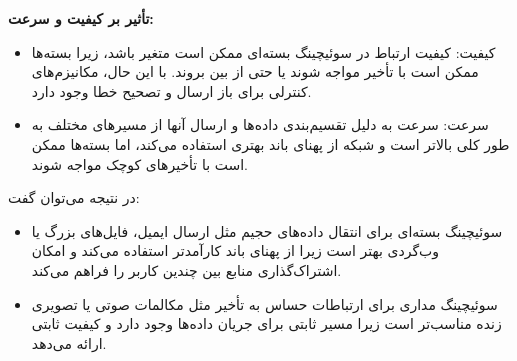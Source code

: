 \begin{qsolve}
\begin{enumerate}
		\textbf{تأثیر بر کیفیت و سرعت:}
		\begin{itemize}
			\item 
			کیفیت: کیفیت ارتباط در سوئیچینگ بسته‌ای ممکن است متغیر باشد، زیرا بسته‌ها ممکن است با تأخیر مواجه شوند یا حتی از بین بروند. با این حال، مکانیزم‌های کنترلی برای باز ارسال و تصحیح خطا وجود دارد.
			
			\item 
			سرعت: سرعت به دلیل تقسیم‌بندی داده‌ها و ارسال آنها از مسیرهای مختلف به طور کلی بالاتر است و شبکه از پهنای باند بهتری استفاده می‌کند، اما بسته‌ها ممکن است با تأخیرهای کوچک مواجه شوند.
		\end{itemize}
	\end{enumerate}
\end{qsolve}


\begin{qsolve}
	در نتیجه می‌توان گفت:
	\begin{itemize}
		\item 
		سوئیچینگ بسته‌ای برای انتقال داده‌های حجیم مثل ارسال ایمیل، فایل‌های بزرگ یا وب‌گردی بهتر است زیرا از پهنای باند کارآمدتر استفاده می‌کند و امکان اشتراک‌گذاری منابع بین چندین کاربر را فراهم می‌کند.
		
		\item 
		سوئیچینگ مداری برای ارتباطات حساس به تأخیر مثل مکالمات صوتی یا تصویری زنده مناسب‌تر است زیرا مسیر ثابتی برای جریان داده‌ها وجود دارد و کیفیت ثابتی ارائه می‌دهد.
	\end{itemize}
\end{qsolve}



